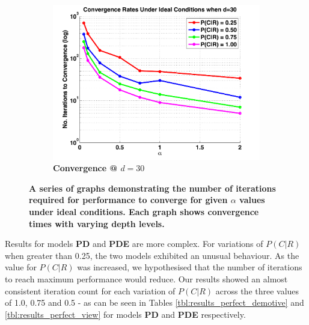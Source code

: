 \begin{figure}
\begin{subfigure}{.33\textwidth}
	  \includegraphics[width=\textwidth]{pics/perfect/simple_multiplicative_d30.pdf}
	  \caption{\textbf{Convergence @ $d=30$}}
	  \label{fig:sub2}
	\end{subfigure}
	
	\caption{\label{fig:perfect_convergence}\textbf{A series of graphs demonstrating the number of iterations required for performance to converge for given $\alpha$ values under ideal conditions. Each graph shows convergence times with varying depth levels.}}
\end{figure}

Results for models \textbf{PD} and \textbf{PDE} are more complex. For variations of $P(C|R)$ when greater than 0.25, the two models exhibited an unusual behaviour. As the value for $P(C|R)$ was increased, we hypothesised that the number of iterations to reach maximum performance would reduce. Our results showed an almost consistent iteration count for each variation of $P(C|R)$ across the three values of 1.0, 0.75 and 0.5 - as can be seen in Tables \ref{tbl:results_perfect_demotive} and \ref{tbl:results_perfect_view} for models \textbf{PD} and \textbf{PDE} respectively.

